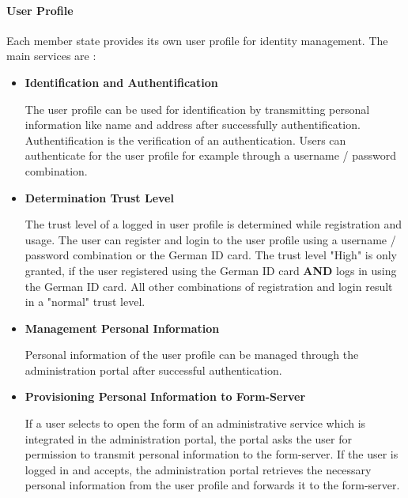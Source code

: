 \documentclass[
     12pt,         %
     a4paper,      %
     BCOR=10mm,version=first,     %
     DIV=14,version=first,        %
     ]{scrreprt}
\begin{document}
\paragraph{User Profile}
Each member state provides its own user profile for identity management. The main services are \cite{NRW:Umsetzung}:

\begin{itemize}
    \item \textbf{Identification and Authentification} \cite{dNRW:Anbindungsleitfaden}
    
    The user profile can be used for identification by transmitting personal information like name and address after successfully authentification. Authentification is the verification of an authentication. Users can authenticate for the user profile for example through a username / password combination.
    
    \item \textbf{Determination Trust Level} \cite{dNRW:Anbindungsleitfaden}
    
    The trust level of a logged in user profile is determined while registration and usage. The user can register and login to the user profile using a username / password combination or the German ID card. The trust level "High" is only granted, if the user registered using the German ID card \textbf{AND} logs in using the German ID card. All other combinations of registration and login result in a "normal" trust level.
    
    \item \textbf{Management Personal Information} \cite{dNRW:Anbindungsleitfaden} 
    
    Personal information of the user profile can be managed through the administration portal after successful authentication.
    
    \item \textbf{Provisioning Personal Information to Form-Server} \cite{dNRW:Anbindungsleitfaden} \cite{dNRW:Schnittstellen}
    
    If a user selects to open the form of an administrative service which is integrated in the administration portal, the portal asks the user for permission to transmit personal information to the form-server. If the user is logged in and accepts, the administration portal retrieves the necessary personal information from the user profile and forwards it to the form-server.
    
\end{itemize}
\end{document}
